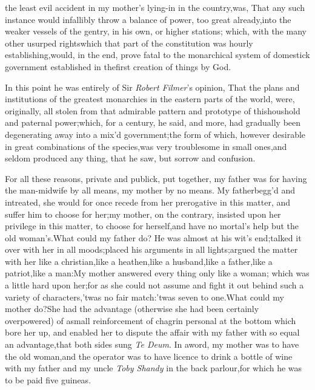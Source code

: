 \documentclass{article}
\begin{document}
\noindent
{}
the least evil accident in my mother’s lying-in in the
country,\tsh  was, That any such instance would infallibly throw
a balance of power, too great already,\break into the weaker
vessels of the gentry, in his own, or higher stations;\tsh
which, with the many other usurped rights\break which that part
of the constitution was hourly establishing,\tsk  would, in the
end, prove fatal to the monarchical system of domestick
government established in the\break first creation of things by
God.

In this point he was entirely of Sir \textit{Robert Filmer}’s
opinion, That the plans and institutions of the greatest
monarchies in the eastern parts of the world, were, originally,
all stolen from that admirable pattern and prototype of
this\break houshold and paternal power;\tsk  which, for a
century, he said, and more, had gradually been
degenerating away into a mix’d government;\tsh  the form of
which, however desirable in great combinations of the
species,\tsh  was very troublesome in small ones,\tsk  and
seldom produced any thing, that he saw, but sorrow and
confusion.

For all these reasons, private and pub\-lick, put together,\tsk
my father was for having the man-midwife by all means,\tsk
my mother by no means. My father\break begg’d and intreated, she
would for once recede from her prerogative in this matter, and
suffer him to choose for her;\tsk  my mother, on the
contrary, insisted up\-on her privilege in this matter, to
choose for herself,\tsk  and have no mortal’s help but the old
woman’s.\tsk  What could my father do? He was almost at his
wit’s end;\tsh  talked it over with her in all
moods;\tsk  placed his arguments in all lights;\tsk  argued the
matter with her like a christian,\tsk  like a heathen,\tsk  like
a husband,\tsk  like a father,\tsk  like a patriot,\tsk  like a
man:\tsk  My mother answered every thing only like a woman;
which was a little hard upon her;\tsk  for as she could not
assume and fight it out behind such a variety of
characters,\tsk\break  ’twas no fair match:\tsk  ’twas seven to
one.\tsk  What could my mother do?\tsk\break  She had the
advantage (otherwise she had been certainly overpowered) of
a\break small reinforcement of chagrin personal at the bottom
which bore her up, and enabled her to dispute the affair with my
father with so equal an advantage,\tsh\break  that both sides
sung \textit{Te Deum}. In a\break word, my mother was to have
the old woman,\tsk  and the operator was to have licence to
drink a bottle of wine with my father and my uncle
\textit{Toby Shandy} in the back parlour,\tsk  for which he was
to be paid five guineas.
\end{document}
